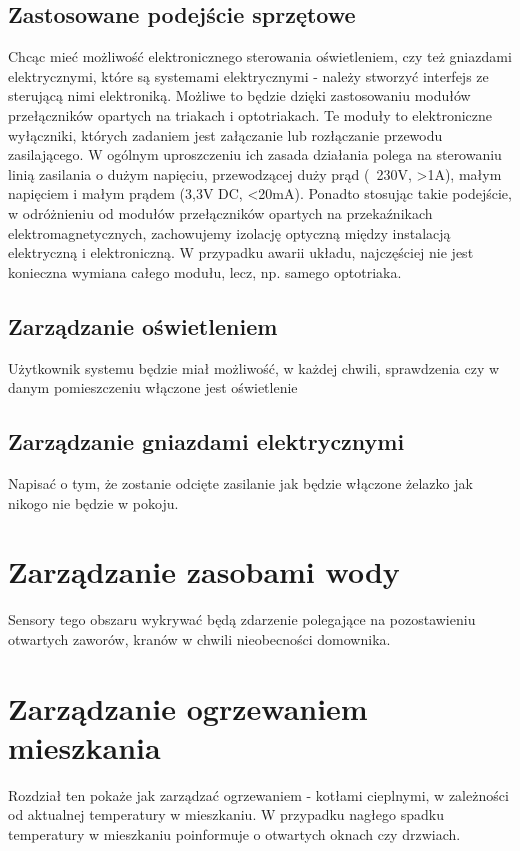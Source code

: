 \documentclass[12pt]{article} %
\begin{document}
\subsection{Zastosowane podejście sprzętowe}
Chcąc mieć możliwość elektronicznego sterowania oświetleniem, czy też gniazdami elektrycznymi, które są systemami elektrycznymi - należy stworzyć interfejs ze sterującą nimi elektroniką. Możliwe to będzie dzięki zastosowaniu modułów przełączników opartych na triakach i optotriakach. Te moduły to elektroniczne wyłączniki, których zadaniem jest załączanie lub rozłączanie przewodu zasilającego. W ogólnym uproszczeniu ich zasada działania polega na sterowaniu linią zasilania o dużym napięciu, przewodzącej duży prąd (~230V, >1A), małym napięciem i małym prądem (3,3V DC, <20mA). Ponadto stosując takie podejście, w odróżnieniu od modułów przełączników opartych na przekaźnikach elektromagnetycznych, zachowujemy izolację optyczną między instalacją elektryczną i elektroniczną. W przypadku awarii układu, najczęściej nie jest konieczna wymiana całego modułu, lecz, np. samego optotriaka.

\subsection{Zarządzanie oświetleniem}
Użytkownik systemu będzie miał możliwość, w każdej chwili, sprawdzenia czy w danym pomieszczeniu włączone jest oświetlenie 

\subsection{Zarządzanie gniazdami elektrycznymi}
Napisać o tym, że zostanie odcięte zasilanie jak będzie włączone żelazko jak nikogo nie będzie w pokoju.
\section{Zarządzanie zasobami wody}
Sensory tego obszaru wykrywać będą zdarzenie polegające na pozostawieniu otwartych zaworów, kranów w chwili nieobecności domownika.

\section{Zarządzanie ogrzewaniem mieszkania}
Rozdział ten pokaże jak zarządzać ogrzewaniem - kotłami cieplnymi, w zależności od aktualnej temperatury w mieszkaniu. W przypadku nagłego spadku temperatury w mieszkaniu poinformuje o otwartych oknach czy drzwiach.
\end{document}
